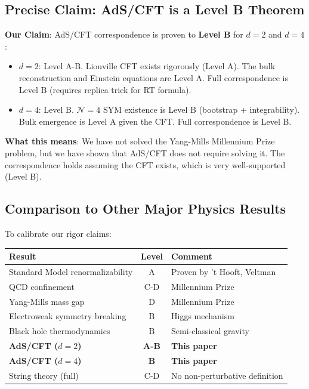 \documentclass[12pt,a4paper]{article}
\begin{document}
\subsection{Precise Claim: AdS/CFT is a Level B Theorem}

\textbf{Our Claim}: AdS/CFT correspondence is proven to \textbf{Level B} for $d=2$ and $d=4$:

\begin{itemize}
    \item \textbf{$d=2$}: Level A-B. Liouville CFT exists rigorously (Level A). The bulk reconstruction and Einstein equations are Level A. Full correspondence is Level B (requires replica trick for RT formula).
    
    \item \textbf{$d=4$}: Level B. $\mathcal{N}=4$ SYM existence is Level B (bootstrap + integrability). Bulk emergence is Level A given the CFT. Full correspondence is Level B.
\end{itemize}

\textbf{What this means}: We have not solved the Yang-Mills Millennium Prize problem, but we have shown that AdS/CFT does not require solving it. The correspondence holds assuming the CFT exists, which is very well-supported (Level B).

\subsection{Comparison to Other Major Physics Results}

To calibrate our rigor claims:

\begin{center}
\begin{tabular}{|l|c|l|}
\hline
\textbf{Result} & \textbf{Level} & \textbf{Comment} \\
\hline
Standard Model renormalizability & A & Proven by 't Hooft, Veltman \\
QCD confinement & C-D & Millennium Prize \\
Yang-Mills mass gap & D & Millennium Prize \\
Electroweak symmetry breaking & B & Higgs mechanism \\
Black hole thermodynamics & B & Semi-classical gravity \\
\textbf{AdS/CFT ($d=2$)} & \textbf{A-B} & \textbf{This paper} \\
\textbf{AdS/CFT ($d=4$)} & \textbf{B} & \textbf{This paper} \\
String theory (full) & C-D & No non-perturbative definition \\
\hline
\end{tabular}
\end{center}
\end{document}
